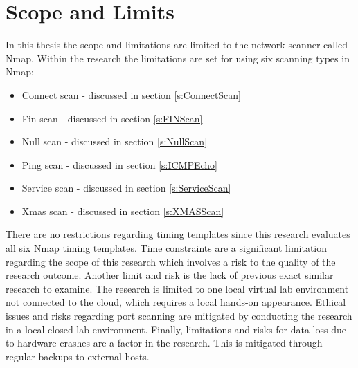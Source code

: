 \newpage
\section{Scope and Limits}
\label{s:ScopeLimits}

In this thesis the scope and limitations are limited to the network scanner called Nmap.
Within the research the limitations are set for using six scanning types in Nmap:
\begin{itemize}
    \item Connect scan - discussed in section \ref{s:ConnectScan}
    \item Fin scan - discussed in section \ref{s:FINScan}
    \item Null scan - discussed in section \ref{s:NullScan}
    \item Ping scan - discussed in section \ref{s:ICMPEcho}
    \item Service scan - discussed in section \ref{s:ServiceScan}
    \item Xmas scan - discussed in section \ref{s:XMASScan}
\end{itemize}



There are no restrictions regarding timing templates since this research evaluates all six Nmap timing templates.
Time constraints are a significant limitation regarding the scope of this research which involves a risk to the quality of the research outcome.
Another limit and risk is the lack of previous exact similar research to examine.
The research is limited to one local virtual lab environment not connected to the cloud, which requires a local hands-on appearance.
Ethical issues and risks regarding port scanning are mitigated by conducting the research in a local closed lab environment.
Finally, limitations and risks for data loss due to hardware crashes are a factor in the research. This is mitigated through regular backups to external hosts.